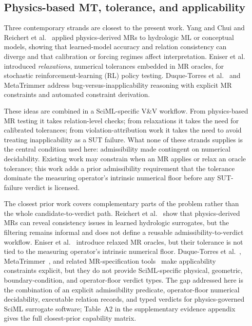 \documentclass[preprint,12pt,authoryear]{elsarticle}
\begin{document}
\subsection{Physics-based MT, tolerance, and applicability}
\label{subsec:physics-mt}

Three contemporary strands are closest to the present work. Yang and Chui \citep{yang2021hydromt} and Reichert et al.~\citep{reichert2024hess} applied physics-derived MRs to hydrologic ML or conceptual models, showing that learned-model accuracy and relation consistency can diverge and that calibration or forcing regimes affect interpretation. Eniser et al.~\citep{eniser2022relaxations} introduced \emph{relaxations}, numerical tolerances embedded in MR oracles, for stochastic reinforcement-learning (RL) policy testing. Duque-Torres et al.~\citep{duqueTorres2023bugornot,duqueTorres2023completePipeline,duqueTorres2024selecting} and MetaTrimmer \citep{duqueTorres2023metaTrimmer} address bug-versus-inapplicability reasoning with explicit MR constraints and automated constraint derivation.

These ideas are combined in a SciML-specific V\&V workflow. From physics-based MR testing it takes relation-level checks; from relaxations it takes the need for calibrated tolerances; from violation-attribution work it takes the need to avoid treating inapplicability as a SUT failure. What none of these strands supplies is the central condition used here: admissibility made contingent on numerical decidability. Existing work may constrain when an MR applies or relax an oracle tolerance; this work adds a prior admissibility requirement that the tolerance dominate the measuring operator's intrinsic numerical floor before any SUT-failure verdict is licensed.

The closest prior work covers complementary parts of the problem rather than the whole candidate-to-verdict path. Reichert et al.~\citep{reichert2024hess} show that physics-derived MRs can reveal consistency issues in learned hydrologic surrogates, but the filtering remains informal and does not define a reusable admissibility-to-verdict workflow. Eniser et al.~\citep{eniser2022relaxations} introduce relaxed MR oracles, but their tolerance is not tied to the measuring operator's intrinsic numerical floor. Duque-Torres et al.~\citep{duqueTorres2023bugornot,duqueTorres2023completePipeline,duqueTorres2024selecting}, MetaTrimmer~\citep{duqueTorres2023metaTrimmer}, and related MR-specification tools~\citep{sun2026ccml} make applicability constraints explicit, but they do not provide SciML-specific physical, geometric, boundary-condition, and operator-floor verdict types. The gap addressed here is the combination of an explicit admissibility predicate, operator-floor numerical decidability, executable relation records, and typed verdicts for physics-governed SciML surrogate software; Table~A2 in the supplementary evidence appendix gives the full closest-prior capability matrix.
\end{document}
